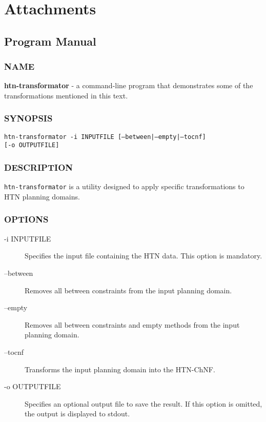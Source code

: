 \documentclass[12pt,a4paper]{report}
\begin{document}
\chapter{Attachments}

\section{Program Manual}

\subsection*{NAME}
\textbf{htn-transformator} - a command-line program that demonstrates some of the transformations mentioned in this text.

\subsection*{SYNOPSIS}
\texttt{htn-transformator -i INPUTFILE [--between|--empty|--tocnf]} \\
\texttt{[-o OUTPUTFILE]}

\subsection*{DESCRIPTION}
\texttt{htn-transformator} is a utility designed to apply specific transformations to HTN planning domains.

\subsection*{OPTIONS}
\begin{description}
\item[-i INPUTFILE]
Specifies the input file containing the HTN data. This option is mandatory.

\item[--between]
Removes all between constraints from the input planning domain.

\item[--empty]
Removes all between constraints and empty methods from the input planning domain.

\item[--tocnf]
Transforms the input planning domain into the HTN-ChNF.

\item[-o OUTPUTFILE]
Specifies an optional output file to save the result. If this option is omitted, the output is displayed to stdout.
\end{description}
\end{document}
